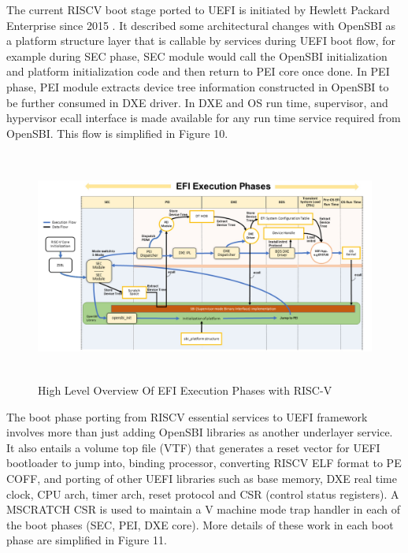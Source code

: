 \documentclass[review]{elsarticle}
\begin{document}
The current RISCV boot stage ported to UEFI is initiated by Hewlett Packard Enterprise since 2015 \cite{R51:2}. It described some architectural changes with OpenSBI as a platform structure layer that is callable by services during UEFI boot flow, for example during SEC phase, SEC module would call the OpenSBI initialization and platform initialization code and then return to PEI core once done. In PEI phase, PEI module extracts device tree information constructed in OpenSBI to be further consumed in DXE driver. In DXE and OS run time, supervisor, and hypervisor ecall interface is made available for any run time service required from OpenSBI. This flow is simplified in Figure 10.

\begin{figure}[H]
	\centering
	\includegraphics[width=1\textwidth,height=3in]{figs/HighLevelOverviewOfEfi.JPG}
	\caption{High Level Overview Of EFI Execution Phases with RISC-V \cite{R51:2}}
\end{figure}

The boot phase porting from RISCV essential services to UEFI framework involves more than just adding OpenSBI libraries as another underlayer service. It also entails a volume top file (VTF) that generates a reset vector for UEFI bootloader to jump into, binding processor, converting RISCV ELF format to PE COFF, and porting of other UEFI libraries such as base memory, DXE real time clock, CPU arch, timer arch, reset protocol and CSR (control status registers). A MSCRATCH CSR is used to maintain a V machine mode trap handler in each of the boot phases (SEC, PEI, DXE core). More details of these work in each boot phase are simplified in Figure 11.
\end{document}
